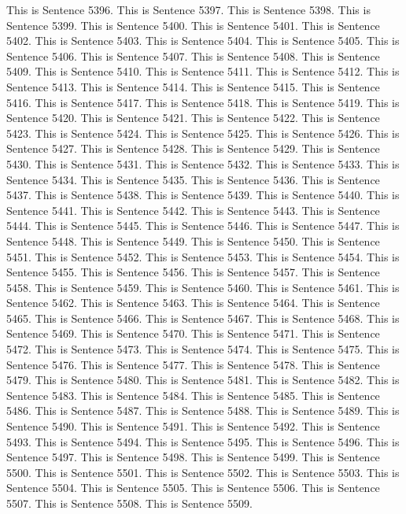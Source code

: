 \documentclass{article}
\begin{document}
This is Sentence 5396.
This is Sentence 5397.
This is Sentence 5398.
This is Sentence 5399.
This is Sentence 5400.
This is Sentence 5401.
This is Sentence 5402.
This is Sentence 5403.
This is Sentence 5404.
This is Sentence 5405.
This is Sentence 5406.
This is Sentence 5407.
This is Sentence 5408.
This is Sentence 5409.
This is Sentence 5410.
This is Sentence 5411.
This is Sentence 5412.
This is Sentence 5413.
This is Sentence 5414.
This is Sentence 5415.
This is Sentence 5416.
This is Sentence 5417.
This is Sentence 5418.
This is Sentence 5419.
This is Sentence 5420.
This is Sentence 5421.
This is Sentence 5422.
This is Sentence 5423.
This is Sentence 5424.
This is Sentence 5425.
This is Sentence 5426.
This is Sentence 5427.
This is Sentence 5428.
This is Sentence 5429.
This is Sentence 5430.
This is Sentence 5431.
This is Sentence 5432.
This is Sentence 5433.
This is Sentence 5434.
This is Sentence 5435.
This is Sentence 5436.
This is Sentence 5437.
This is Sentence 5438.
This is Sentence 5439.
This is Sentence 5440.
This is Sentence 5441.
This is Sentence 5442.
This is Sentence 5443.
This is Sentence 5444.
This is Sentence 5445.
This is Sentence 5446.
This is Sentence 5447.
This is Sentence 5448.
This is Sentence 5449.
This is Sentence 5450.
This is Sentence 5451.
This is Sentence 5452.
This is Sentence 5453.
This is Sentence 5454.
This is Sentence 5455.
This is Sentence 5456.
This is Sentence 5457.
This is Sentence 5458.
This is Sentence 5459.
This is Sentence 5460.
This is Sentence 5461.
This is Sentence 5462.
This is Sentence 5463.
This is Sentence 5464.
This is Sentence 5465.
This is Sentence 5466.
This is Sentence 5467.
This is Sentence 5468.
This is Sentence 5469.
This is Sentence 5470.
This is Sentence 5471.
This is Sentence 5472.
This is Sentence 5473.
This is Sentence 5474.
This is Sentence 5475.
This is Sentence 5476.
This is Sentence 5477.
This is Sentence 5478.
This is Sentence 5479.
This is Sentence 5480.
This is Sentence 5481.
This is Sentence 5482.
This is Sentence 5483.
This is Sentence 5484.
This is Sentence 5485.
This is Sentence 5486.
This is Sentence 5487.
This is Sentence 5488.
This is Sentence 5489.
This is Sentence 5490.
This is Sentence 5491.
This is Sentence 5492.
This is Sentence 5493.
This is Sentence 5494.
This is Sentence 5495.
This is Sentence 5496.
This is Sentence 5497.
This is Sentence 5498.
This is Sentence 5499.
This is Sentence 5500.
This is Sentence 5501.
This is Sentence 5502.
This is Sentence 5503.
This is Sentence 5504.
This is Sentence 5505.
This is Sentence 5506.
This is Sentence 5507.
This is Sentence 5508.
This is Sentence 5509.
\end{document}
